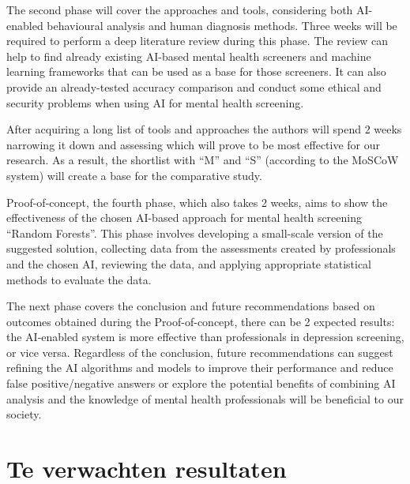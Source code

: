 \documentclass[dutch]{hogent-article}
\begin{document}
The second phase will cover the approaches and tools, considering both AI-enabled behaviour\-al analysis and human diagnosis methods. Three weeks will be required to perform a deep literature review during this phase. The review can help to find already existing AI-based mental health screeners and machine learning frameworks that can be used as a base for those screeners. It can also provide an already-tested accuracy comparison and conduct some ethical and security problems when using AI for mental health screening.

After acquiring a long list of tools and approa\-ches the authors will spend 2 weeks narrowing it down and assessing which will prove to be most effective for our research. As a result, the shortlist with ``M'' and ``S'' (according to the MoSCoW system) will create a base for the comparative study.

Proof-of-concept, the fourth phase, which also takes 2 weeks, aims to show the effectiveness of the chosen AI-based approach for mental health screening ``Random Forests''. This phase involves developing a small-scale version of the suggested solution, collecting data from the assessments created by professionals and the chosen AI, reviewing the data, and applying appropriate statistical methods to evaluate the data.

The next phase covers the conclusion and future recommendations based on outcomes obtained during the Proof-of-concept, there can be 2 expected results: the AI-enabled system is more effective than professionals in depression screening, or vice versa. Regardless of the conclusion, future recommendations can suggest refining the AI algorithms and models to improve their performance and reduce false positive/negative answers or explore the potential benefits of combining AI analysis and the knowledge of mental health professionals will be beneficial to our society.

\section{Te verwachten resultaten}%
\label{sec:expected-results}

\end{document}
